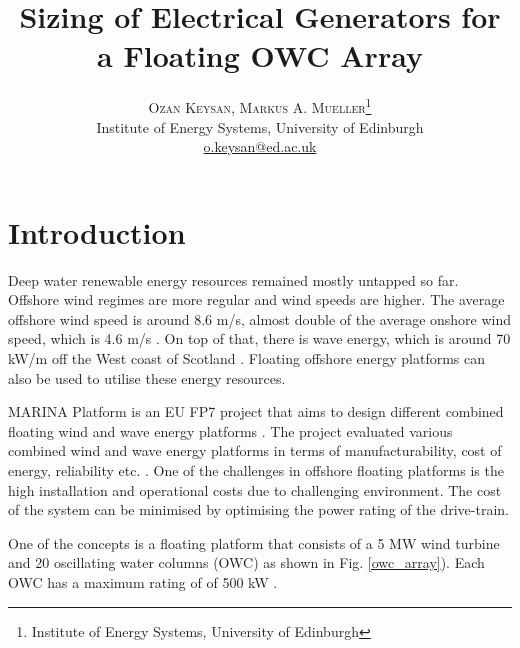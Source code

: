 \documentclass[twocolumn]{article}
\title{\vspace{-15mm}\fontsize{24pt}{10pt}\selectfont\textbf{Sizing of Electrical Generators for a Floating OWC Array}} %
\author{
\large
\textsc{Ozan Keysan, Markus A. Mueller}\thanks{Institute of Energy Systems, University of Edinburgh}\\[2mm] %
\normalsize Institute of Energy Systems, University of Edinburgh \\ %
\normalsize \href{mailto:o.keysan@ed.ac.uk}{o.keysan@ed.ac.uk} %
\vspace{-5mm}
}
\date{}
\begin{document}

\section{Introduction}

Deep water renewable energy resources remained mostly untapped so far. Offshore wind regimes are more regular and wind speeds are higher. The average offshore wind speed is around 8.6 m/s, almost double of the average onshore wind speed, which is 4.6 m/s \cite{Hau2013}. On top of that, there is wave energy, which is around 70 kW/m off the West coast of Scotland \cite{BERR2008}. Floating offshore energy platforms can also be used to utilise these energy resources.

MARINA Platform is an EU FP7 project that aims to design different combined floating wind and wave energy platforms \cite{marinaweb}. The project evaluated various combined wind and wave energy platforms in terms of manufacturability, cost of energy, reliability etc. \cite{MarinaPlatform2012}. One of the challenges in offshore floating platforms is the high installation and operational costs due to challenging environment. The cost of the system can be minimised by optimising the power rating of the drive-train. 

One of the concepts is a floating platform that consists of a 5 MW wind turbine and 20 oscillating water columns (OWC) as shown in Fig. \ref{owc_array}). Each OWC has a maximum rating of of 500 kW \cite{Sullivan2013}.
\end{document}
